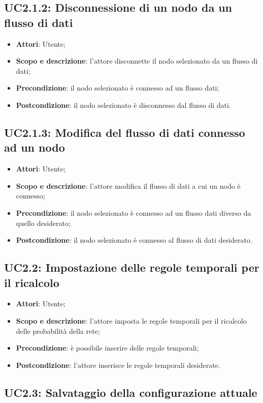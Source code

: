 \subsection{UC2.1.2: Disconnessione di un nodo da un flusso di dati}
\hypertarget{UC2.1.2}{}
\begin{itemize}
	\item \textbf{Attori}: Utente;
	\item \textbf{Scopo e descrizione}: l'attore disconnette il nodo selezionato da un flusso di dati;
	\item \textbf{Precondizione}: il nodo selezionato è connesso ad un flusso dati;
	\item \textbf{Postcondizione}: il nodo selezionato è disconnesso dal flusso di dati.
\end{itemize}

\subsection{UC2.1.3: Modifica del flusso di dati connesso ad un nodo}
\hypertarget{UC2.1.3}{}
\begin{itemize}
	\item \textbf{Attori}: Utente;
	\item \textbf{Scopo e descrizione}: l'attore modifica il flusso di dati a cui un nodo è connesso;
	\item \textbf{Precondizione}: il nodo selezionato è connesso ad un flusso dati diverso da quello desiderato;
	\item \textbf{Postcondizione}: il nodo selezionato è connesso al flusso di dati desiderato.
\end{itemize}
\subsection{UC2.2: Impostazione delle regole temporali per il ricalcolo}
\hypertarget{UC2.2}{}
\begin{itemize}
	\item \textbf{Attori}: Utente;
	\item \textbf{Scopo e descrizione}: l'attore imposta le regole temporali per il ricalcolo delle probabilità della rete;
	\item \textbf{Precondizione}: è possibile inserire delle regole temporali;
	\item \textbf{Postcondizione}: l'attore inserisce le regole temporali desiderate.
\end{itemize}
\subsection{UC2.3: Salvataggio della configurazione attuale}

